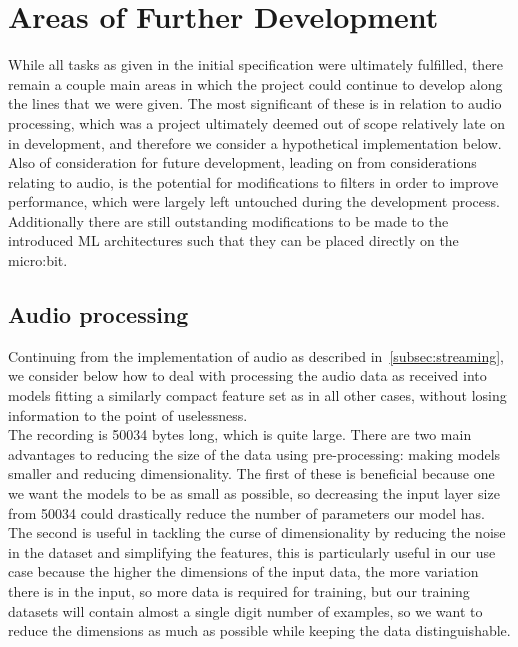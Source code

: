 \documentclass{article}
\begin{document}
\section{Areas of Further Development}%
\label{sec:development}

While all tasks as given in the initial specification were ultimately fulfilled, there remain a couple main areas in which the project could continue to develop along the lines that we were given. The most significant of these is in relation to audio processing, which was a project ultimately deemed out of scope relatively late on in development, and therefore we consider a hypothetical implementation below. Also of consideration for future development, leading on from considerations relating to audio, is the potential for modifications to filters in order to improve performance, which were largely left untouched during the development process. Additionally there are still outstanding modifications to be made to the introduced ML architectures such that they can be placed directly on the micro:bit.

\subsection{Audio processing}%
\label{subsec:audio}

Continuing from the implementation of audio as described in~\ref{subsec:streaming}, we consider below how to deal with processing the audio data as received into models fitting a similarly compact feature set as in all other cases, without losing information to the point of uselessness. \\

The recording is 50034 bytes long, which is quite large. There are two main advantages to reducing the size of the data using pre-processing: making models smaller and reducing dimensionality. The first of these is beneficial because one we want the models to be as small as possible, so decreasing the input layer size from 50034 could drastically reduce the number of parameters our model has. The second is useful in tackling the curse of dimensionality by reducing the noise in the dataset and simplifying the features, this is particularly useful in our use case because the higher the dimensions of the input data, the more variation there is in the input, so more data is required for training, but our training datasets will contain almost a single digit number of examples, so we want to reduce the dimensions as much as possible while keeping the data distinguishable. \\
\end{document}
